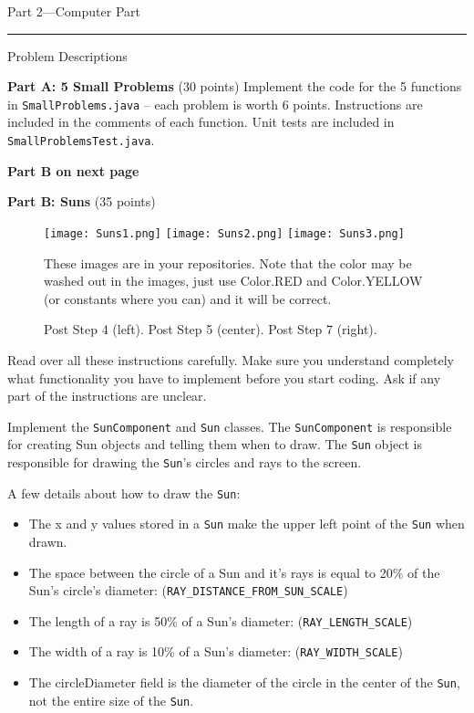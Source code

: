 \documentclass[12pt,twoside]{article}
\newcommand{\code}[1]{\texttt{#1}}
\begin{document}
\clearpage
{\Large Part 2---Computer Part}

\vspace{0.25in}
\hrule
{\large Problem Descriptions}

\textbf{Part A: 5 Small Problems} (30 points) Implement the code for the 5 functions in \code{SmallProblems.java} -- each problem is worth 6 points.  Instructions are included in the comments of each function.  Unit tests are included in \code{SmallProblemsTest.java}.

\textbf{Part B on next page}

\clearpage

\textbf{Part B: Suns} (35 points) 

\begin{figure}
	\begin{center}
		\texttt{[image: Suns1.png]}
		\texttt{[image: Suns2.png]}
		\texttt{[image: Suns3.png]}
	\end{center}
	\caption*{Post Step 4 (left). Post Step 5 (center). Post Step 7 (right).}
	These images are in your repositories. Note that the color may be washed out in the images, just use Color.RED and Color.YELLOW (or constants where you can) and it will be correct.
	\label{fig:one}
\end{figure}


Read over all these instructions carefully.  Make sure you understand completely what functionality you have to implement before you start coding.  Ask if any part of the instructions are unclear.

Implement the \code{SunComponent} and \code{Sun} classes.  The \code{SunComponent} is responsible for creating Sun objects and telling them when to draw. The \code{Sun} object is responsible for drawing the \code{Sun}'s circles and rays to the screen.

A few details about how to draw the \code{Sun}:
\begin{itemize}
\item The x and y values stored in a \code{Sun} make the upper left point of the \code{Sun} when drawn.
\item The space between the circle of a Sun and it's rays is equal to 20\% of the Sun's circle's diameter: (\code{RAY_DISTANCE_FROM_SUN_SCALE})
\item The length of a ray is 50\% of a Sun's diameter: (\code{RAY_LENGTH_SCALE})
\item The width of a ray is 10\% of a Sun's diameter: (\code{RAY_WIDTH_SCALE})
\item The circleDiameter field is the diameter of the circle in the center of the \code{Sun}, not the entire size of the \code{Sun}.
\end{itemize}
\end{document}
